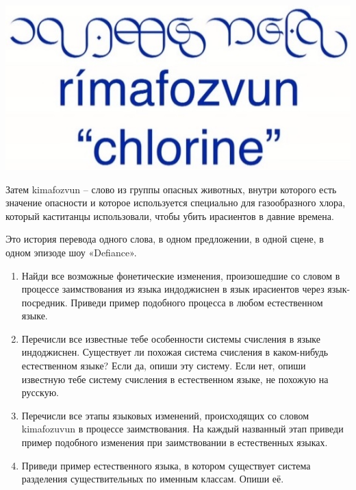     \begin{center}
    \includegraphics[scale=0.2]{lingua/image10-33.jpeg}
    \end{center}
    
    Затем kimafozvun – слово из группы опасных животных, внутри которого есть значение опасности и которое используется специально для газообразного хлора, который каститанцы использовали, чтобы убить ирасиентов в давние времена.
    
    Это история перевода одного слова, в одном предложении, в одной сцене, в одном эпизоде шоу «Defiance».

\begin{enumerate}
    \item Найди все возможные фонетические изменения, произошедшие со словом в процессе заимствования из языка индоджиснен в язык ирасиентов через язык-посредник. Приведи пример подобного процесса в любом естественном языке.
    
    \item Перечисли все известные тебе особенности системы счисления в языке индоджиснен. Существует ли похожая система счисления в каком-нибудь естественном языке? Если да, опиши эту систему. Если нет, опиши известную тебе систему счисления в естественном языке, не похожую на русскую.
    
    \item Перечисли все этапы языковых изменений, происходящих со словом kimafozuvun в процессе заимствования. На каждый названный этап приведи пример подобного изменения при заимствовании в естественных языках. 
    
    \item Приведи пример естественного языка, в котором существует система разделения существительных по именным классам. Опиши её.
\end{enumerate}    


